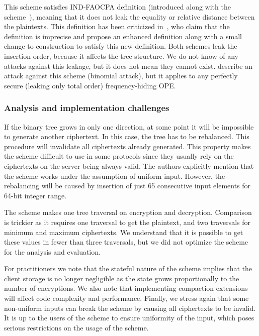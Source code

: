 		This scheme satisfies IND-FAOCPA definition (introduced along with the scheme~\cite{fh-ope}), meaning that it does not leak the equality or relative distance between the plaintexts.
		This definition has been criticized in~\cite{florian-def-critique}, who claim that the definition is imprecise and propose an enhanced definition along with a small change to construction to satisfy this new definition.
		Both schemes leak the insertion order, because it affects the tree structure.
		We do not know of any attacks against this leakage, but it does not mean they cannot exist.
		\textcite{leakage-abuse-grubs-2017} describe an attack against this scheme (binomial attack), but it applies to any perfectly secure (leaking only total order) frequency-hiding OPE\@.

	\subsubsection{Analysis and implementation challenges}

		If the binary tree grows in only one direction, at some point it will be impossible to generate another ciphertext.
		In this case, the tree has to be rebalanced.
		This procedure will invalidate all ciphertexts already generated.
		This property makes the scheme difficult to use in some protocols since they usually rely on the ciphertexts on the server being always valid.
		The authors explicitly mention that the scheme works under the assumption of uniform input.
		However, the rebalancing will be caused by insertion of just 65 consecutive input elements for 64-bit integer range.

		The scheme makes one tree traversal on encryption and decryption.
		Comparison is trickier as it requires one traversal to get the plaintext, and two traversals for minimum and maximum ciphertexts.
		We understand that it is possible to get these values in fewer than three traversals, but we did not optimize the scheme for the analysis and evaluation.

		For practitioners we note that the stateful nature of the scheme implies that the client storage is no longer negligible as the state grows proportionally to the number of encryptions.
		We also note that implementing compaction extensions will affect code complexity and performance.
		Finally, we stress again that some non-uniform inputs can break the scheme by causing all ciphertexts to be invalid.
		It is up to the users of the scheme to ensure uniformity of the input, which poses serious restrictions on the usage of the scheme.
